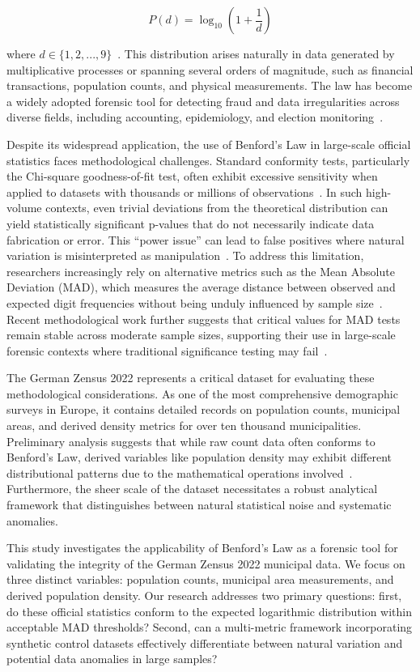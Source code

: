 \documentclass[11pt,a4paper]{article}
\begin{document}
$$ P(d) = \log_{10}\left(1 + \frac{1}{d}\right) $$

where $d \in \{1, 2, ..., 9\}$~\cite{Miller2015BenfordsLT}. This distribution arises naturally in data generated by multiplicative processes or spanning several orders of magnitude, such as financial transactions, population counts, and physical measurements. The law has become a widely adopted forensic tool for detecting fraud and data irregularities across diverse fields, including accounting, epidemiology, and election monitoring~\cite{Azevedo2021ABL}.

Despite its widespread application, the use of Benford's Law in large-scale official statistics faces methodological challenges. Standard conformity tests, particularly the Chi-square goodness-of-fit test, often exhibit excessive sensitivity when applied to datasets with thousands or millions of observations~\cite{Kossovsky2021OnTM}. In such high-volume contexts, even trivial deviations from the theoretical distribution can yield statistically significant p-values that do not necessarily indicate data fabrication or error. This ``power issue'' can lead to false positives where natural variation is misinterpreted as manipulation~\cite{Cerqueti2021SomeNT}. To address this limitation, researchers increasingly rely on alternative metrics such as the Mean Absolute Deviation (MAD), which measures the average distance between observed and expected digit frequencies without being unduly influenced by sample size~\cite{Kossler2024SomeNI}. Recent methodological work further suggests that critical values for MAD tests remain stable across moderate sample sizes, supporting their use in large-scale forensic contexts where traditional significance testing may fail~\cite{Kossler2024SomeNI}.

The German Zensus 2022 represents a critical dataset for evaluating these methodological considerations. As one of the most comprehensive demographic surveys in Europe, it contains detailed records on population counts, municipal areas, and derived density metrics for over ten thousand municipalities. Preliminary analysis suggests that while raw count data often conforms to Benford's Law, derived variables like population density may exhibit different distributional patterns due to the mathematical operations involved~\cite{Druica2018BenfordsLA}. Furthermore, the sheer scale of the dataset necessitates a robust analytical framework that distinguishes between natural statistical noise and systematic anomalies.

This study investigates the applicability of Benford's Law as a forensic tool for validating the integrity of the German Zensus 2022 municipal data. We focus on three distinct variables: population counts, municipal area measurements, and derived population density. Our research addresses two primary questions: first, do these official statistics conform to the expected logarithmic distribution within acceptable MAD thresholds? Second, can a multi-metric framework incorporating synthetic control datasets effectively differentiate between natural variation and potential data anomalies in large samples?
\end{document}
